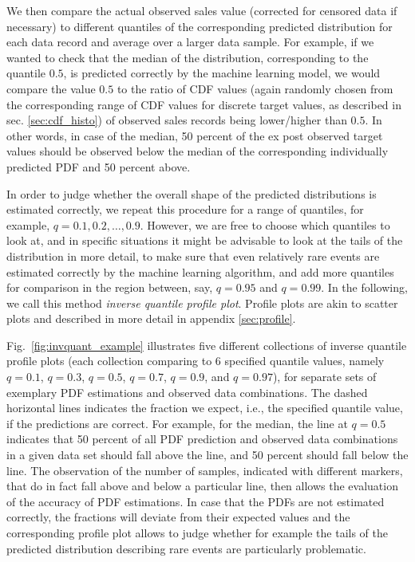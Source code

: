 \documentclass[BCOR=1mm, DIV=calc,10pt,
twoside=true,
twocolumn,
headings=normal]{scrartcl}
\newcommand{\fig}{Fig.~}
\begin{document}
We then compare the actual observed sales value (corrected for censored data if necessary) to different quantiles of the corresponding predicted distribution for each data record and average over a larger data sample. For example, if we wanted to check that the median of the distribution, corresponding to the quantile $0.5$, is predicted correctly by the machine learning model, we would compare the value $0.5$ to the ratio of CDF values (again randomly chosen from the corresponding range of CDF values for discrete target values, as described in sec. \ref{sec:cdf_histo}) of observed sales records being lower/higher than $0.5$. In other words, in case of the median, 50 percent of the ex post observed target values should be observed below the median of the corresponding individually predicted PDF and 50 percent above.

In order to judge whether the overall shape of the predicted distributions is estimated correctly, we repeat this procedure for a range of quantiles, for example, $q = 0.1, 0.2, \ldots, 0.9$. However, we are free to choose which quantiles to look at, and in specific situations it might be advisable to look at the tails of the distribution in more detail, to make sure that even relatively rare events are estimated correctly by the machine learning algorithm, and add more quantiles for comparison in the region between, say, $q = 0.95$ and $q = 0.99$. In the following, we call this method {\em inverse quantile profile plot}. Profile plots are akin to scatter plots and described in more detail in appendix \ref{sec:profile}.

\fig \ref{fig:invquant_example} illustrates five different collections of inverse quantile profile plots (each collection comparing to 6 specified quantile values, namely $q = 0.1$, $q = 0.3$, $q = 0.5$, $q = 0.7$, $q = 0.9$, and $q = 0.97$), for separate sets of exemplary PDF estimations and observed data combinations. The dashed horizontal lines indicates the fraction we expect, i.e., the specified quantile value, if the predictions are correct. For example, for the median, the line at $q = 0.5$ indicates that  50 percent of all PDF prediction and observed data combinations in a given data set should fall above the line, and 50 percent should fall below the line. The observation of the number of samples, indicated with different markers, that do in fact fall above and below a particular line, then allows the evaluation of the accuracy of PDF estimations. In case that the PDFs are not estimated correctly, the fractions will deviate from their expected values and the corresponding profile plot allows to judge whether for example the tails of the predicted distribution describing rare events are particularly problematic.
\end{document}
